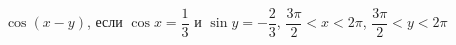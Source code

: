 \begin{ex}[type=simplify_calculate]
	\begin{condition}
		\( \cos(x-y) \), \quad если \( \cos x=\dfrac{1}{3} \) и \( \sin y=-\dfrac{2}{3} \), \( \dfrac{3\pi}{2}<x<2\pi \), \( \dfrac{3\pi}{2}<y<2\pi  \)
	\end{condition}
\end{ex}